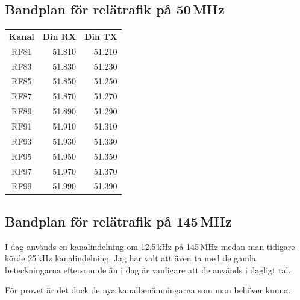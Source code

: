 \subsection{Bandplan för relätrafik på 50\,MHz}

\begin{tabular}{crr}
	\textbf{Kanal} & \textbf{Din RX} & \textbf{Din TX} \\
	     RF81      &    \num{51,810} &    \num{51,210} \\
	     RF83      &    \num{51,830} &    \num{51,230} \\
	     RF85      &    \num{51,850} &    \num{51,250} \\
	     RF87      &    \num{51,870} &    \num{51,270} \\
	     RF89      &    \num{51,890} &    \num{51,290} \\
	     RF91      &    \num{51,910} &    \num{51,310} \\
	     RF93      &    \num{51,930} &    \num{51,330} \\
	     RF95      &    \num{51,950} &    \num{51,350} \\
	     RF97      &    \num{51,970} &    \num{51,370} \\
	     RF99      &    \num{51,990} &    \num{51,390}
\end{tabular}
	
\subsection{Bandplan för relätrafik på 145\,MHz}

I dag används en kanalindelning om 12,5\,kHz på 145\,MHz medan man tidigare körde 25\,kHz kanalindelning. Jag har valt att även ta med de gamla beteckningarna eftersom de än i dag är vanligare att de används i dagligt tal.

För provet är det dock de nya kanalbenämningarna som man behöver kunna.

